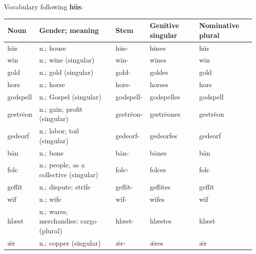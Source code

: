 Vocabulary following \textbf{hūs}:

\par\begingroup
\fontsize{10.5}{13.2}\selectfont
\setlength{\LTleft}{0pt}\setlength{\LTright}{\fill}
\noindent
\begin{tabular}{@{}>{\raggedright\arraybackslash}p{16.11mm}>{\raggedright\arraybackslash}p{38.17mm}>{\raggedright\arraybackslash}p{16.11mm}>{\raggedright\arraybackslash}p{21.18mm}>{\raggedright\arraybackslash}p{21.18mm}@{}}
\toprule
\textbf{Noun} & \textbf{Gender; meaning} & \textbf{Stem} & \textbf{Genitive singular} & \textbf{Nominative plural} \\
\midrule
hūs & n.; house & hūs- & hūses & hūs \\
wīn & n.; wine (singular) & wīn- & wīnes & wīn \\
gold & n.; gold (singular) & gold- & goldes & gold \\
hors & n.; horse & hors- & horses & hors \\
godspell & n.; Gospel (singular) & godspell- & godspelles & godspell \\
gestrēon & n.; gain; profit (singular) & gestrēon- & gestrēones & gestrēon \\
gedeorf & n.; labor; toil (singular) & gedeorf- & gedeorfes & gedeorf \\
bān & n.; bone & bān- & bānes & bān \\
folc & n.; people, as a collective (singular) & folc- & folces & folc \\
geflīt & n.; dispute; strife & geflīt- & geflītes & geflīt \\
wīf & n.; wife & wīf- & wīfes & wīf \\
hlæst & n.; wares; merchandise; cargo (plural) & hlæst- & hlæstes & hlæst \\
ǣr & n.; copper (singular) & ǣr- & ǣres & ǣr \\
\bottomrule
\end{tabular}
\par\endgroup

